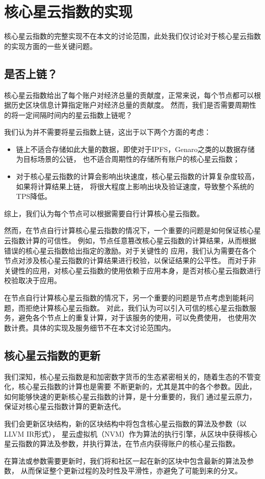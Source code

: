\section{核心星云指数的实现}
核心星云指数的完整实现不在本文的讨论范围，此处我们仅讨论对于核心星云指数的实现方面的一些关键问题。

\subsection{是否上链？\label{sec:onchain?}}
核心星云指数给出了每个账户对经济总量的贡献度，正常来说，每个节点都可以根据历史区块信息计算指定账户对经济总量的贡献度。
然而，我们是否需要周期性的将一定间隔时间内的星云指数上链呢？

我们认为并不需要将星云指数上链，这出于以下两个方面的考虑：
\begin{itemize}
\item 链上不适合存储如此大量的数据，即使对于IPFS，Genaro之类的以数据存储为目标场景的公链，
也不适合周期性的存储所有账户的核心星云指数；
\item 对于核心星云指数的计算会影响出块速度，核心星云指数的计算复杂度较高，如果将计算结果上链，
将很大程度上影响出块及验证速度，导致整个系统的TPS降低。
\end{itemize}
\noindent 综上，我们认为每个节点可以根据需要自行计算核心星云指数。

然而，在节点自行计算核心星云指数的情况下，一个重要的问题是如何保证核心星云指数计算的可信性。
例如，节点任意篡改核心星云指数的计算结果，从而根据错误的核心星云指数给出指定的激励。对于关键性的
应用，我们认为需要在各个节点对涉及核心星云指数的计算结果进行校验，以保证结果的公平性。
而对于非关键性的应用，对核心星云指数的使用依赖于应用本身，是否对核心星云指数进行校验取决于应用。

在节点自行计算核心星云指数的情况下，另一个重要的问题是节点考虑到能耗问题，而拒绝计算核心星云指数。
对此，我们认为可以引入可信的核心星云指数服务，避免各个节点上的重复计算，对于该服务的使用，可以免费使用，
也使用次数计费。具体的实现及服务细节不在本文讨论范围内。

\subsection{核心星云指数的更新}
我们深知，核心星云指数是和加密数字货币的生态紧密相关的，随着生态的不管变化，核心星云指数的计算也是需要
不断更新的，尤其是其中的各个参数。因此，如何能够快速的更新核心星云指数的计算，是十分重要的，我们
通过星云原力，保证对核心星云指数计算的更新迭代。

我们会更新区块结构，新的区块结构中将包含核心星云指数的算法及参数（以LLVM IR形式），
星云虚拟机（NVM）作为算法的执行引擎，从区块中获得核心星云指数的算法及参数，并执行算法，在节点内获得账户的核心星云指数。

在算法或参数需要更新时，我们将和社区一起在新的区块中包含最新的算法及参数，
从而保证整个更新过程的及时性及平滑性，亦避免了可能到来的分叉。


%
